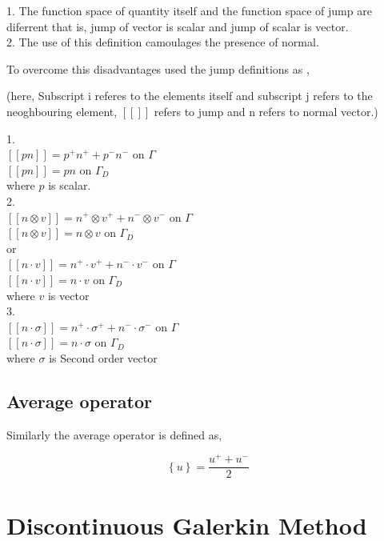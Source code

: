 \documentclass[a4paper,10pt]{book}
\begin{document}
1. The function space of quantity itself and the function space of jump are diferrent that is, jump of vector is scalar and jump of scalar is vector.\\
2. The use of this definition camoulages the presence of normal.

To overcome this disadvantages \citep{Montlaur2} used the jump definitions as ,

(here, Subscript i referes to the elements itself and subscript j refers to the neoghbouring element, $[[ ]]$ refers to jump and n refers to normal vector.)

1. \\
$[[pn]] = p^+ n^+ + p^- n^- $ on $\Gamma$\\
$[[pn]] = p n $ on $\Gamma_D$\\
where $p$ is scalar. \\

2. \\
$[[n \otimes v]] = n^+ \otimes v^+ + n^- \otimes v^-$ on $\Gamma$\\
$[[n \otimes v]] = n \otimes v$ on $\Gamma_D$\\
 or \\
$[[n \cdot v]] = n^+ \cdot v^+ + n^- \cdot v^-$ on $\Gamma$\\
$[[n \cdot v]] = n \cdot v$ on $\Gamma_D$\\
where $v$ is vector\\

3. \\
$[[n \cdot \sigma]] = n^+ \cdot \sigma^+ + n^- \cdot \sigma^-$ on $\Gamma$\\
$[[n \cdot \sigma]] = n \cdot \sigma$ on $\Gamma_D$\\
where $\sigma$ is Second order vector

\subsection{Average operator}

Similarly the average operator is defined as,

\begin{equation}\label{average operator}
\left\lbrace u \right\rbrace = \frac{u^+ + u^-}{2}  
\end{equation} 

\section{Discontinuous Galerkin Method}
\end{document}
